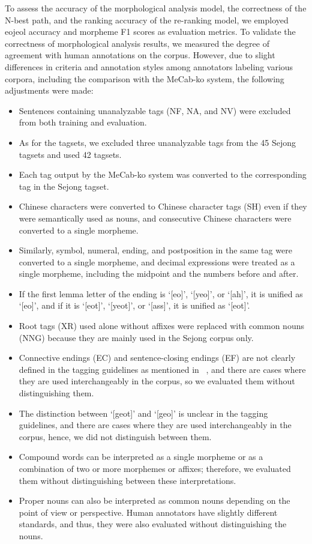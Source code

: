 \documentclass[AMS,STIX2COL]{WileyNJD-v2}
\begin{document}
    To assess the accuracy of the morphological analysis model, the correctness of the N-best path, and the ranking accuracy of the re-ranking model, we employed eojeol accuracy and morpheme F1 scores as evaluation metrics.
    To validate the correctness of morphological analysis results, we measured the degree of agreement with human annotations on the corpus.
    However, due to slight differences in criteria and annotation styles among annotators labeling various corpora, including the comparison with the MeCab-ko system, the following adjustments were made:
    \begin{itemize}
        \item Sentences containing unanalyzable tags (NF, NA, and NV) were excluded from both training and evaluation.
        \item As for the tagsets, we excluded three unanalyzable tags from the 45 Sejong tagsets and used 42 tagsets.
        \item Each tag output by the MeCab-ko system was converted to the corresponding tag in the Sejong tagset.
        \item Chinese characters were converted to Chinese character tags (SH) even if they were semantically used as nouns, and consecutive Chinese characters were converted to a single morpheme.
        \item Similarly, symbol, numeral, ending, and postposition in the same tag were converted to a single morpheme, and decimal expressions were treated as a single morpheme, including the midpoint and the numbers before and after.
        \item If the first lemma letter of the ending is `[eo]', `[yeo]', or `[ah]', it is unified as `[eo]', and if it is `[eot]', `[yeot]', or `[ass]', it is unified as `[eot]'. %
        \item Root tags (XR) used alone without affixes were replaced with common nouns (NNG) because they are mainly used in the Sejong corpus only.
        \item Connective endings (EC) and sentence-closing endings (EF) are not clearly defined in the tagging guidelines as mentioned in ~\cite{KimIH2010}, and there are cases where they are used interchangeably in the corpus, so we evaluated them without distinguishing them.
        \item The distinction between `[geot]' and `[geo]' is unclear in the tagging guidelines, and there are cases where they are used interchangeably in the corpus, hence, we did not distinguish between them. %
        \item Compound words can be interpreted as a single morpheme or as a combination of two or more morphemes or affixes; therefore, we evaluated them without distinguishing between these interpretations.
        \item Proper nouns can also be interpreted as common nouns depending on the point of view or perspective. Human annotators have slightly different standards, and thus, they were also evaluated without distinguishing the nouns.
    \end{itemize}
\end{document}
